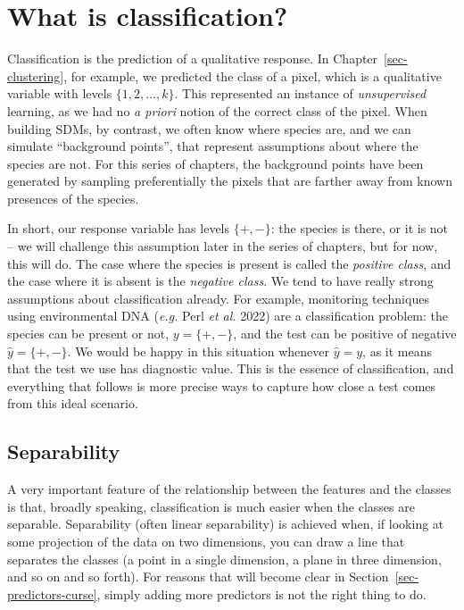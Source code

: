 \documentclass[
  letterpaper,
]{scrbook}
\begin{document}
\section{What is classification?}\label{what-is-classification}

Classification is the prediction of a qualitative response. In
Chapter~\ref{sec-clustering}, for example, we predicted the class of a
pixel, which is a qualitative variable with levels
\(\{1, 2, \dots, k\}\). This represented an instance of
\emph{unsupervised} learning, as we had no \emph{a priori} notion of the
correct class of the pixel. When building SDMs, by contrast, we often
know where species are, and we can simulate ``background points'', that
represent assumptions about where the species are not. For this series
of chapters, the background points have been generated by sampling
preferentially the pixels that are farther away from known presences of
the species.


In short, our response variable has levels \(\{+, -\}\): the species is
there, or it is not -- we will challenge this assumption later in the
series of chapters, but for now, this will do. The case where the
species is present is called the \emph{positive class}, and the case
where it is absent is the \emph{negative class}. We tend to have really
strong assumptions about classification already. For example, monitoring
techniques using environmental DNA (\emph{e.g.} Perl \emph{et al.} 2022)
are a classification problem: the species can be present or not,
\(y = \{+,-\}\), and the test can be positive of negative
\(\hat y = \{+,-\}\). We would be happy in this situation whenever
\(\hat y = y\), as it means that the test we use has diagnostic value.
This is the essence of classification, and everything that follows is
more precise ways to capture how close a test comes from this ideal
scenario.

\subsection{Separability}\label{separability}

A very important feature of the relationship between the features and
the classes is that, broadly speaking, classification is much easier
when the classes are separable. Separability (often linear separability)
is achieved when, if looking at some projection of the data on two
dimensions, you can draw a line that separates the classes (a point in a
single dimension, a plane in three dimension, and so on and so forth).
For reasons that will become clear in
Section~\ref{sec-predictors-curse}, simply adding more predictors is not
the right thing to do.
\end{document}
